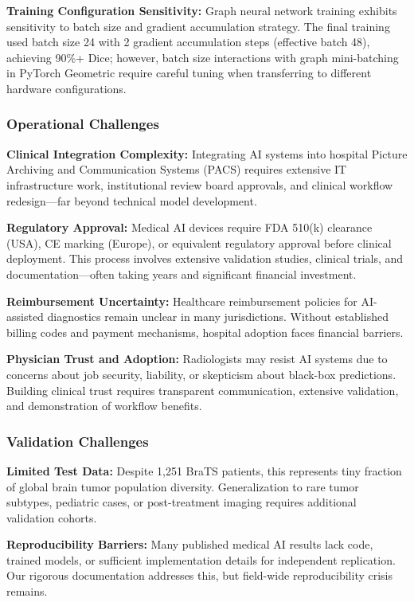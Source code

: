 \documentclass{article}
\begin{document}
\textbf{Training Configuration Sensitivity:} Graph neural network training exhibits sensitivity to batch size and gradient accumulation strategy. The final training used batch size 24 with 2 gradient accumulation steps (effective batch 48), achieving 90\%+ Dice; however, batch size interactions with graph mini-batching in PyTorch Geometric require careful tuning when transferring to different hardware configurations.

\subsubsection{Operational Challenges}

\textbf{Clinical Integration Complexity:} Integrating AI systems into hospital Picture Archiving and Communication Systems (PACS) requires extensive IT infrastructure work, institutional review board approvals, and clinical workflow redesign—far beyond technical model development.

\textbf{Regulatory Approval:} Medical AI devices require FDA 510(k) clearance (USA), CE marking (Europe), or equivalent regulatory approval before clinical deployment. This process involves extensive validation studies, clinical trials, and documentation—often taking years and significant financial investment.

\textbf{Reimbursement Uncertainty:} Healthcare reimbursement policies for AI-assisted diagnostics remain unclear in many jurisdictions. Without established billing codes and payment mechanisms, hospital adoption faces financial barriers.

\textbf{Physician Trust and Adoption:} Radiologists may resist AI systems due to concerns about job security, liability, or skepticism about black-box predictions. Building clinical trust requires transparent communication, extensive validation, and demonstration of workflow benefits.

\subsubsection{Validation Challenges}

\textbf{Limited Test Data:} Despite 1,251 BraTS patients, this represents tiny fraction of global brain tumor population diversity. Generalization to rare tumor subtypes, pediatric cases, or post-treatment imaging requires additional validation cohorts.

\textbf{Reproducibility Barriers:} Many published medical AI results lack code, trained models, or sufficient implementation details for independent replication. Our rigorous documentation addresses this, but field-wide reproducibility crisis remains.
\end{document}
